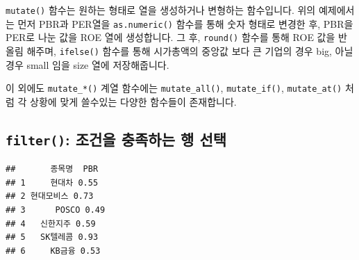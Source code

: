 \documentclass[12pt,]{book}
\newenvironment{Shaded}{\begin{snugshade}}{\end{snugshade}}
\newcommand{\DataTypeTok}[1]{\textcolor[rgb]{0.13,0.29,0.53}{#1}}
\newcommand{\DecValTok}[1]{\textcolor[rgb]{0.00,0.00,0.81}{#1}}
\newcommand{\FloatTok}[1]{\textcolor[rgb]{0.00,0.00,0.81}{#1}}
\newcommand{\KeywordTok}[1]{\textcolor[rgb]{0.13,0.29,0.53}{\textbf{#1}}}
\newcommand{\NormalTok}[1]{#1}
\newcommand{\OperatorTok}[1]{\textcolor[rgb]{0.81,0.36,0.00}{\textbf{#1}}}
\newcommand{\StringTok}[1]{\textcolor[rgb]{0.31,0.60,0.02}{#1}}
\begin{document}
\texttt{mutate()} 함수는 원하는 형태로 열을 생성하거나 변형하는 함수입니다. 위의 예제에서는 먼저 PBR과 PER열을 \texttt{as.numeric()} 함수를 통해 숫자 형태로 변경한 후, PBR을 PER로 나눈 값을 ROE 열에 생성합니다. 그 후, \texttt{round()} 함수를 통해 ROE 값을 반올림 해주며, \texttt{ifelse()} 함수를 통해 시가총액의 중앙값 보다 큰 기업의 경우 big, 아닐 경우 small 임을 size 열에 저장해줍니다.

이 외에도 \texttt{mutate\_*()} 계열 함수에는 \texttt{mutate\_all()}, \texttt{mutate\_if()}, \texttt{mutate\_at()} 처럼 각 상황에 맞게 쓸수있는 다양한 함수들이 존재합니다.

\hypertarget{filter----}{%
\subsection{\texorpdfstring{\texttt{filter()}: 조건을 충족하는 행 선택}{filter(): 조건을 충족하는 행 선택}}\label{filter----}}

\begin{Shaded}
\end{Shaded}

\begin{verbatim}
##       종목명  PBR
## 1     현대차 0.55
## 2 현대모비스 0.73
## 3      POSCO 0.49
## 4   신한지주 0.59
## 5   SK텔레콤 0.93
## 6     KB금융 0.53
\end{verbatim}

\begin{Shaded}
\end{Shaded}
\end{document}
